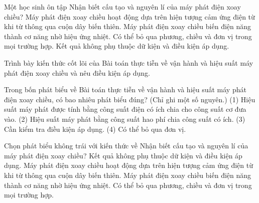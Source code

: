 \begin{ex}
Một học sinh ôn tập Nhận biết cấu tạo và nguyên lí của máy phát điện xoay chiều?
\choice
{\True Máy phát điện xoay chiều hoạt động dựa trên hiện tượng cảm ứng điện từ khi từ thông qua cuộn dây biến thiên.}
{Máy phát điện xoay chiều biến điện năng thành cơ năng nhờ hiệu ứng nhiệt.}
{Có thể bỏ qua phương, chiều và đơn vị trong mọi trường hợp.}
{Kết quả không phụ thuộc dữ kiện và điều kiện áp dụng.}
\end{ex}

\begin{bt}
Trình bày kiến thức cốt lõi của Bài toán thực tiễn về vận hành và hiệu suất máy phát điện xoay chiều và nêu điều kiện áp dụng.
\end{bt}

\begin{ex}
Trong bốn phát biểu về Bài toán thực tiễn về vận hành và hiệu suất máy phát điện xoay chiều, có bao nhiêu phát biểu đúng? (Chỉ ghi một số nguyên.) (1) Hiệu suất máy phát được tính bằng công suất điện có ích chia cho công suất cơ đưa vào. (2) Hiệu suất máy phát bằng công suất hao phí chia công suất có ích. (3) Cần kiểm tra điều kiện áp dụng. (4) Có thể bỏ qua đơn vị.
\end{ex}

\begin{ex}
Chọn phát biểu không trái với kiến thức về Nhận biết cấu tạo và nguyên lí của máy phát điện xoay chiều?
\choice
{Kết quả không phụ thuộc dữ kiện và điều kiện áp dụng.}
{\True Máy phát điện xoay chiều hoạt động dựa trên hiện tượng cảm ứng điện từ khi từ thông qua cuộn dây biến thiên.}
{Máy phát điện xoay chiều biến điện năng thành cơ năng nhờ hiệu ứng nhiệt.}
{Có thể bỏ qua phương, chiều và đơn vị trong mọi trường hợp.}
\end{ex}

